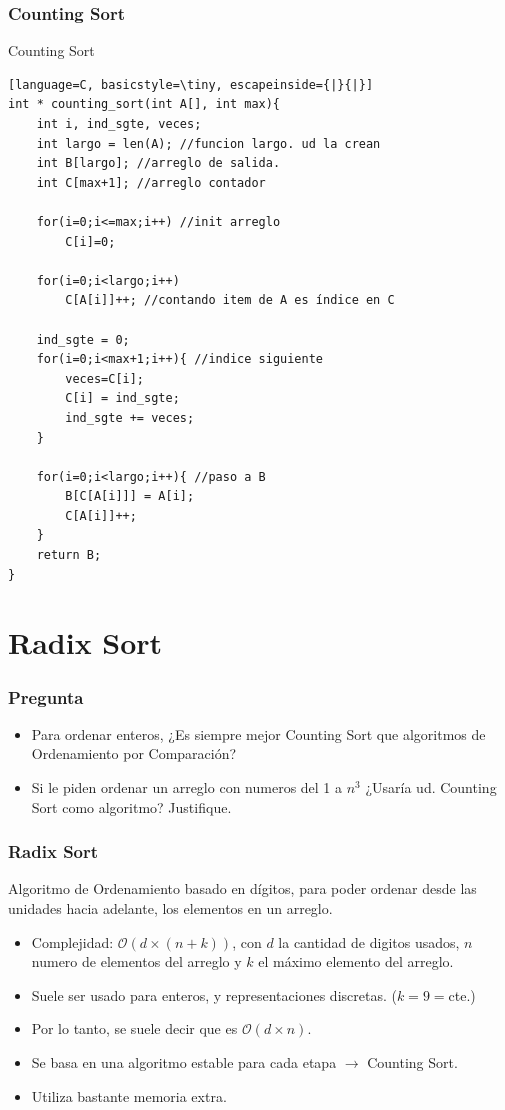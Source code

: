 \documentclass{beamer}
\begin{document}
\begin{frame}[fragile]
 \frametitle{Counting Sort}
\begin{exampleblock}{Counting Sort}
\begin{lstlisting}[language=C, basicstyle=\tiny, escapeinside={|}{|}]
int * counting_sort(int A[], int max){
	int i, ind_sgte, veces;
	int largo = len(A); //funcion largo. ud la crean
	int B[largo]; //arreglo de salida. 
	int C[max+1]; //arreglo contador

	for(i=0;i<=max;i++) //init arreglo
		C[i]=0;
 
	for(i=0;i<largo;i++)
		C[A[i]]++; //contando item de A es índice en C
	
	ind_sgte = 0;
	for(i=0;i<max+1;i++){ //indice siguiente
		veces=C[i];
		C[i] = ind_sgte;		
		ind_sgte += veces;
	}

	for(i=0;i<largo;i++){ //paso a B
		B[C[A[i]]] = A[i];
		C[A[i]]++;
	}
	return B;
}
\end{lstlisting}
\end{exampleblock}
\end{frame}

\section{Radix Sort}

\begin{frame}[fragile]
 \frametitle{Pregunta}
\begin{itemize}
\item Para ordenar enteros, ¿Es siempre mejor Counting Sort que algoritmos de Ordenamiento por Comparación? 
\item Si le piden ordenar un arreglo con numeros del 1 a $n^3$ ¿Usaría ud. Counting Sort como algoritmo? Justifique.  
\end{itemize}
\end{frame}

\begin{frame}[fragile]
 \frametitle{Radix Sort}
\small Algoritmo de Ordenamiento basado en dígitos, para poder ordenar desde las unidades hacia adelante, los elementos en un arreglo. 

\begin{itemize}
\item Complejidad: $\mathcal{O}(d \times (n+k))$, con $d$ la cantidad de digitos usados, $n$ numero de elementos del arreglo y $k$ el máximo elemento del arreglo.
\item Suele ser usado para enteros, y representaciones discretas. ($k=9=$cte.)
\item Por lo tanto, se suele decir que es $\mathcal{O}(d \times n)$. 
\item Se basa en una algoritmo estable para cada etapa $\rightarrow$ Counting Sort. 
\item Utiliza bastante memoria extra. 
\end{itemize}
\end{frame}
\end{document}
